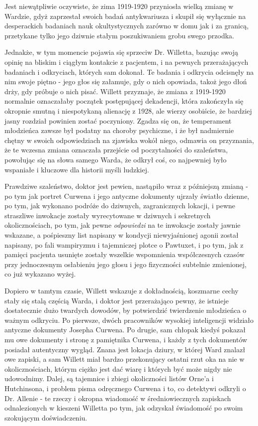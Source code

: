 Jest niewątpliwie oczywiste, że zima 1919-1920 przyniosła wielką zmianę w Wardzie, gdyż zaprzestał swoich badań antykwariusza i skupił się wyłącznie na desperackich badaniach nauk okultystycznych zarówno w domu jak i za granicą, przetykane tylko jego dziwnie stałym poszukiwaniem grobu swego przodka.

Jednakże, w tym momencie pojawia się sprzeciw Dr. Willetta, bazując swoją opinię na bliskim i ciągłym kontakcie z pacjentem, i na pewnych przerażających badaniach i odkryciach, których sam dokonał. Te badania i odkrycia odcisnęły na nim swoje piętno - jego głos się załamuje, gdy o nich opowiada, takoż jego dłoń drży, gdy próbuje o nich pisać. Willett przyznaje, że zmiana z 1919-1920 normalnie oznaczałaby początek postępującej dekadencji, która zakończyła się okropnie smutną i niespotykaną alienację z 1928, ale wierzy osobiście, że bardziej jasny rozdział powinien zostać poczyniony. Zgadza się on, że temperament młodzieńca zawsze był podatny na choroby psychiczne, i że był nadmiernie chętny w swoich odpowiedziach na zjawiska wokół niego, odmawia on przyznania, że te wczesna zmiana oznaczała przejście od poczytalności do szaleństwa, powołując się na słowa samego Warda, że odkrył coś, co najpewniej było wspaniałe i kluczowe dla historii myśli ludzkiej.

Prawdziwe szaleństwo, doktor jest pewien, nastąpiło wraz z późniejszą zmianą - po tym jak portret Curwena i jego antyczne dokumenty ujrzały światło dzienne, po tym, jak wykonano podróże do dziwnych, zagranicznych lokacji, i pewne straszliwe inwokacje zostały wyrecytowane w dziwnych i sekretnych okolicznościach, po tym, jak pewne \textit{odpowiedzi} na te inwokacje zostały jawnie wskazane, a pośpieszny list napisany w kondycji niewyjaśnionej agonii został napisany, po fali wampiryzmu i tajemniczej plotce o Pawtuxet, i po tym, jak z pamięci pacjenta usunięte zostały wszelkie wspomnienia współczesnych czasów  przy jednoczesnym osłabieniu jego głosu i jego fizyczności subtelnie zmienionej, co już wykazano wyżej.

Dopiero w tamtym czasie, Willett wskazuje z dokładnością, koszmarne cechy stały się stalą częścią Warda, i doktor jest przerażająco pewny, że istnieje dostatecznie dużo twardych dowodów, by potwierdzić twierdzenie młodzieńca o ważnym odkryciu. Po pierwsze, dwóch pracowników wysokiej inteligencji widziało antyczne dokumenty Josepha Curwena. Po drugie, sam chłopak kiedyś pokazał mu owe dokumenty i stronę z pamiętnika Curwena, i każdy z tych dokumentów posiadał autentyczny wygląd. Znana jest lokacja dziury, w której Ward znalazł owe zapiski, a sam Willett miał bardzo przekonujący ostatni rzut oka na nie w okolicznościach, którym ciężko jest dać wiarę i których być może nigdy nie udowodnimy. Dalej, są tajemnice i zbiegi okoliczności listów Orne'a i Hutchinsona, i problem pisma odręcznego Curwena i to, co detektywi odkryli o Dr. Allenie - te rzeczy i okropna wiadomość w średniowiecznych zapiskach odnalezionych w kieszeni Willetta po tym, jak odzyskał świadomość po swoim szokującym doświadczeniu.

